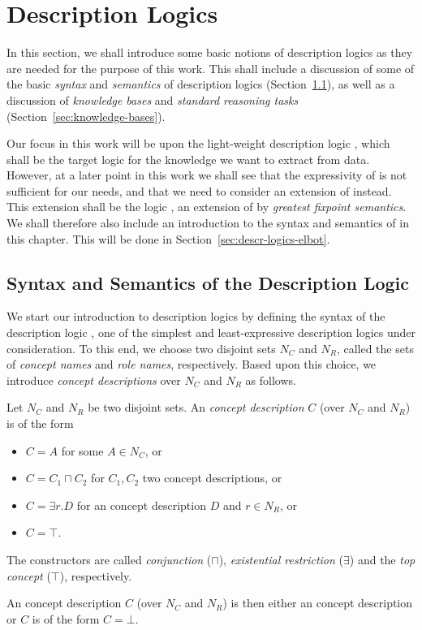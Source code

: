 \chapter{Description Logics}
\label{cha:description-logics}

In this section, we shall introduce some basic notions of description logics as they are
needed for the purpose of this work.  This shall include a discussion of some of the basic
\emph{syntax} and \emph{semantics} of description logics
(Section~\ref{sec:basic-noti-descr}), as well as a discussion of \emph{knowledge bases}
and \emph{standard reasoning tasks} (Section~\ref{sec:knowledge-bases}).

Our focus in this work will be upon the light-weight description logic \ELbot, which shall
be the target logic for the knowledge we want to extract from data.  However, at a later
point in this work we shall see that the expressivity of \ELbot is not sufficient for our
needs, and that we need to consider an extension of \ELbot instead.  This extension shall
be the logic \ELgfpbot, an extension of \ELbot by \emph{greatest fixpoint semantics}.  We
shall therefore also include an introduction to the syntax and semantics of \ELgfpbot in
this chapter.  This will be done in Section~\ref{sec:descr-logics-elbot}.

\section{Syntax and Semantics of the Description Logic \ELbot}
\label{sec:basic-noti-descr}

We start our introduction to description logics by defining the syntax of the description
logic \ELbot, one of the simplest and least-expressive description logics under
consideration.  To this end, we choose two disjoint sets $N_C$ and $N_R$, called the sets
of \emph{concept names} and \emph{role names}, respectively.  Based upon this choice, we
introduce \emph{\ELbot concept descriptions} over $N_C$ and $N_R$ as follows.
\begin{Definition}
  \label{def:ELbot-concept-descriptions}
  Let $N_C$ and $N_R$ be two disjoint sets.  An \emph{\EL concept description} $C$ (over
  $N_C$ and $N_R$) is of the form
  \begin{itemize}
  \item $C = A$ for some $A \in N_C$, or
  \item $C = C_1 \sqcap C_2$ for $C_1, C_2$ two \EL concept descriptions, or
  \item $C = \exists r. D$ for an \EL concept description $D$ and $r \in N_R$, or
  \item $C = \top$.
  \end{itemize}
  The constructors are called \emph{conjunction} ($\sqcap$), \emph{existential
    restriction} ($\exists$) and the \emph{top concept} ($\top$), respectively.

  An \ELbot concept description $C$ (over $N_C$ and $N_R$) is then either an \EL concept
  description or $C$ is of the form $C = \bot$.
\end{Definition}

